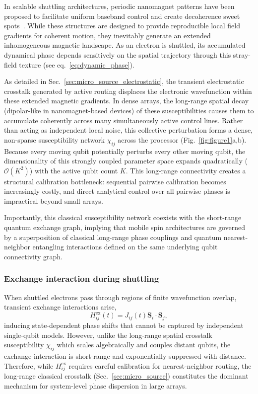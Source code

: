 \documentclass[a4paper,twocolumn,11pt]{quantumarticle}
\begin{document}
In scalable shuttling architectures, periodic nanomagnet patterns have been proposed to facilitate uniform baseband control and create decoherence sweet spots~\cite{unseld_baseband_2025}. While these structures are designed to provide reproducible local field gradients for coherent motion, they inevitably generate an extended inhomogeneous magnetic landscape. As an electron is shuttled, its accumulated dynamical phase depends sensitively on the spatial trajectory through this stray-field texture (see eq.~\eqref{eq:dynamic_phase}).

As detailed in Sec.~\ref{sec:micro_source_electrostatic}, the transient electrostatic crosstalk generated by active routing displaces the electronic wavefunction within these extended magnetic gradients. In dense arrays, the long-range spatial decay (dipolar-like in nanomagnet-based devices) of these susceptibilities causes them to accumulate coherently across many simultaneously active control lines. Rather than acting as independent local noise, this collective perturbation forms a dense, non-sparse susceptibility network $\chi_{ij}$ across the processor (Fig.~\ref{fig:figure1}a,b).
Because every moving qubit potentially perturbs every other moving qubit, the dimensionality of this strongly coupled parameter space expands quadratically ($\mathcal{O}(K^2)$) with the active qubit count $K$. This long-range connectivity creates a structural calibration bottleneck: sequential pairwise calibration becomes increasingly costly, and direct analytical control over all pairwise phases is impractical beyond small arrays.

Importantly, this classical susceptibility network coexists with the short-range quantum exchange graph, implying that mobile spin architectures are governed by a superposition of classical long-range phase couplings and quantum nearest-neighbor entangling interactions defined on the same underlying qubit connectivity graph.

\subsubsection{Exchange interaction during shuttling}

When shuttled electrons pass through regions of finite wavefunction overlap, transient exchange interactions arise,
\begin{equation}
    H_{ij}^{\text{ex}}(t) = J_{ij}(t) \mathbf{S}_i \cdot \mathbf{S}_j,
\end{equation}
inducing state-dependent phase shifts that cannot be captured by independent single-qubit models. However, unlike the long-range spatial crosstalk susceptibility $\chi_{ij}$ which scales algebraically and couples distant qubits, the exchange interaction is short-range and exponentially suppressed with distance. Therefore, while $H_{ij}^{\text{ex}}$ requires careful calibration for nearest-neighbor routing, the long-range classical crosstalk (Sec.~\ref{sec:micro_source}) constitutes the dominant mechanism for system-level phase dispersion in large arrays.
\end{document}
